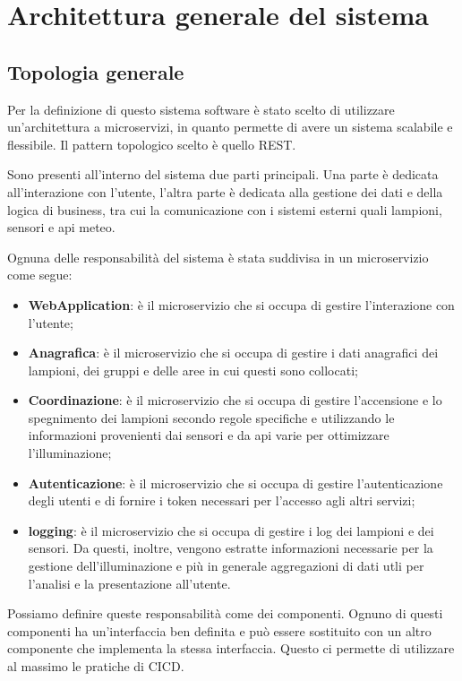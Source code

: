 \chapter{Architettura generale del sistema} \label{cap:architettura-generale}

\section{Topologia generale} \label{sec:topologia_generale}

Per la definizione di questo sistema software è stato scelto di utilizzare un'architettura a microservizi, in quanto permette di avere un sistema scalabile e flessibile. Il pattern topologico scelto è quello REST.

Sono presenti all'interno del sistema due parti principali. Una parte è dedicata all'interazione con l'utente, l'altra parte è dedicata alla gestione dei dati e della logica di business, tra cui la comunicazione con i sistemi esterni quali lampioni, sensori e api meteo.

Ognuna delle responsabilità del sistema è stata suddivisa in un microservizio come segue:

\begin{itemize}
    \item \textbf{WebApplication}: è il microservizio che si occupa di gestire l'interazione con l'utente;
    \item \textbf{Anagrafica}: è il microservizio che si occupa di gestire i dati anagrafici dei lampioni, dei gruppi e delle aree in cui questi sono collocati;
    \item \textbf{Coordinazione}: è il microservizio che si occupa di gestire l'accensione e lo spegnimento dei lampioni secondo regole specifiche e utilizzando le informazioni provenienti dai sensori e da api varie per ottimizzare l'illuminazione;
    \item \textbf{Autenticazione}: è il microservizio che si occupa di gestire l'autenticazione degli utenti e di fornire i token necessari per l'accesso agli altri servizi;
    \item \textbf{logging}: è il microservizio che si occupa di gestire i log dei lampioni e dei sensori. Da questi, inoltre, vengono estratte informazioni necessarie per la gestione dell'illuminazione e più in generale aggregazioni di dati utli per l'analisi e la presentazione all'utente.
\end{itemize}

Possiamo definire queste responsabilità come dei componenti. Ognuno di questi componenti ha un'interfaccia ben definita e può essere sostituito con un altro componente che implementa la stessa interfaccia. Questo ci permette di utilizzare al massimo le pratiche di CICD.

